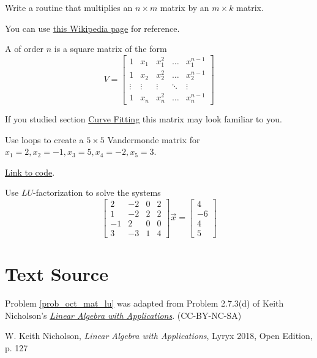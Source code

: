 \documentclass{ximera}
\begin{document}
\begin{problem}\label{prob_oct_6}
    Write a routine that multiplies an $n\times m$ matrix by an $m\times k$ matrix.  

    \begin{hint}
        You can use \href{https://en.wikipedia.org/wiki/Matrix_multiplication_algorithm}{this Wikipedia page} for reference.
    \end{hint}    
\end{problem}

\begin{problem}\label{prob_oct_mat_vandermonde}
    A  of order $n$ is a square matrix of the form 
        $$V=\begin{bmatrix}
    1&x_1&x_1^2&\dots&x_1^{n-1}\\
    1&x_2&x_2^2&\dots&x_2^{n-1}\\
    \vdots&\vdots&\vdots&\ddots&\vdots\\
    1&x_n&x_n^2&\dots&x_n^{n-1}\end{bmatrix}$$  

    If you studied section \href{https://ximera.osu.edu/linearalgebradzv3/LinearAlgebraInteractiveIntro/APP-0070/main}{Curve Fitting} this matrix may look familiar to you. 

    Use loops to create a $5\times 5$ Vandermonde matrix for $x_1=2, x_2=-1, x_3=5, x_4=-2, x_5=3$.

    \begin{hint}
        \href{https://sagecell.sagemath.org/?z=eJxFjEEKgzAURPeB3GE2goIKsWRTcdcjFDdiJeiXRjQpMdQcv7Fd9A08GAYmwY1mbQgKbxq9dejCIHKUZZkjDLLn7Gi6CoWARFHh0tecnUlwf-odhnZPE1ZrXxgdKU97vJJBolVmIrfZaGzKOx04m-O_bsRVcobIWZd_PWlTnS9Zc6Q6e6RLIbL6t5GZOPuq_QBP6C9I&lang=octave&interacts=eJyLjgUAARUAuQ==}{Link to code}.
    \end{hint}
\end{problem}

\begin{problem}\label{prob_oct_mat_lu}
    Use $LU$-factorization to solve the systems
    $$\begin{bmatrix}2 &-2&0&2\\1&-2&2&2\\-1&2&0&0\\3&-3&1&4\end{bmatrix}\vec{x}=\begin{bmatrix}4\\-6\\4\\5\end{bmatrix}$$
\end{problem}

\section*{Text Source} Problem \ref{prob_oct_mat_lu} was adapted from Problem 2.7.3(d) of Keith Nicholson's \href{https://open.umn.edu/opentextbooks/textbooks/linear-algebra-with-applications}{\it Linear Algebra with Applications}. (CC-BY-NC-SA)

W. Keith Nicholson, {\it Linear Algebra with Applications}, Lyryx 2018, Open Edition, p. 127 
\end{document}

